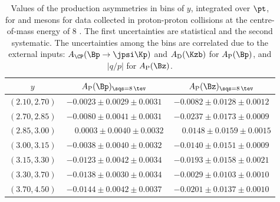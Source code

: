 \begin{table}
\caption{Values of the production asymmetries in bins of $y$, integrated over $\pt$, for \Bp and \Bz mesons for data collected in proton-proton collisions at the centre-of-mass energy of  8 \tev. The first uncertainties are statistical and the second systematic. The uncertainties among the bins are correlated due to the external inputs: $A_{\CP}(\Bp\to\jpsi\Kp)$ and $A_{\rm D}(\Kzb)$ for $A_{\rm P}(\Bp)$, and $|q/p|$ for $A_{\rm P}(\Bz)$. }
\label{tab:AP_BpB0_2012_eta}
\begin{center}
\begin{tabular}{c|c|c}
$y$& $A_{\rm P}(\Bp)_{\sqs = 8\, \tev}$ & $A_{\rm P}(\Bz)_{\sqs = 8\, \tev}$ \\
\hline
$(2.10,  2.70)  $  &  $  -0.0023            \pm  0.0029  \pm  0.0031  $  &  $  -0.0082            \pm  0.0128  \pm  0.0012  $  \\
$(2.70,  2.85)  $  &  $  -0.0080            \pm  0.0041  \pm  0.0031  $  &  $  -0.0237            \pm  0.0173  \pm  0.0009  $  \\
$(2.85,  3.00)  $  &  $  \phantom{-}0.0003  \pm  0.0040  \pm  0.0032  $  &  $  \phantom{-}0.0148  \pm  0.0159  \pm  0.0015  $  \\
$(3.00,  3.15)  $  &  $  -0.0038            \pm  0.0040  \pm  0.0032  $  &  $  -0.0140            \pm  0.0151  \pm  0.0009  $  \\
$(3.15,  3.30)  $  &  $  -0.0123            \pm  0.0042  \pm  0.0034  $  &  $  -0.0193            \pm  0.0158  \pm  0.0021  $  \\
$(3.30,  3.70)  $  &  $  -0.0138            \pm  0.0030  \pm  0.0034  $  &  $  -0.0029            \pm  0.0103  \pm  0.0010  $  \\
$(3.70,  4.50)  $  &  $  -0.0144            \pm  0.0042  \pm  0.0037  $  &  $  -0.0201            \pm  0.0137  \pm  0.0010  $  \\
\end{tabular}
\end{center}
\end{table}


